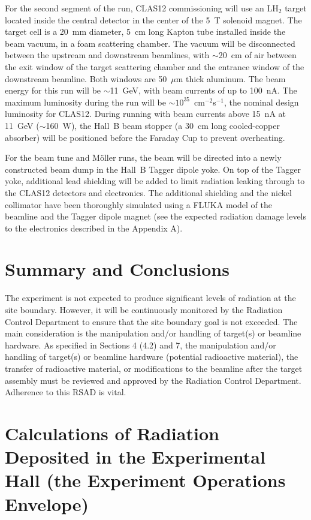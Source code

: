 \documentclass [12pt]{article}
\begin{document}
For the second segment of the run, CLAS12 commissioning will use an LH$_2$ target located inside 
the central detector in the center of the 5~T solenoid magnet. The target cell is a 20~mm diameter, 
5~cm long Kapton tube installed inside the beam vacuum, in a foam scattering chamber. The vacuum 
will be disconnected between the upstream and downstream beamlines, with $\sim$20~cm of air between 
the exit window of the target scattering chamber and the entrance window of the downstream beamline. 
Both windows are 50~$\mu$m thick aluminum. The beam energy for this run will be $\sim$11~GeV, with 
beam currents of up to 100~nA. The maximum luminosity during the run will be 
$\sim 10^{35}$~cm$^{-2}$s$^{-1}$, the nominal design luminosity for CLAS12. During running with beam 
currents above 15~nA at 11~GeV ($\sim$160~W), the Hall~B beam stopper (a 30~cm long cooled-copper 
absorber) will be positioned before the Faraday Cup to prevent overheating. 

For the beam tune and M{\"o}ller runs, the beam will be directed into a newly constructed beam dump in 
the Hall~B Tagger dipole yoke. On top of the Tagger yoke, additional lead shielding will be added 
to limit radiation leaking through to the CLAS12 detectors and electronics. The additional shielding 
and the nickel collimator have been thoroughly simulated using a FLUKA model of the beamline and the 
Tagger dipole magnet (see the expected radiation damage levels to the electronics described in the 
Appendix A).

\section{Summary and Conclusions}
\indent

The experiment is not expected to produce significant levels of radiation at the site boundary. 
However, it will be continuously monitored by the Radiation Control Department to ensure that the 
site boundary goal is not exceeded. The main consideration is the manipulation and/or handling of 
target(s) or beamline hardware. As specified in Sections 4 (4.2) and 7, the manipulation and/or 
handling of target(s) or beamline hardware (potential radioactive material), the transfer of 
radioactive material, or modifications to the beamline after the target assembly must be reviewed 
and approved by the Radiation Control Department. Adherence to this RSAD is vital.


\section{Calculations of Radiation Deposited in the Experimental Hall
(the Experiment Operations Envelope)} 
\indent
\end{document}
